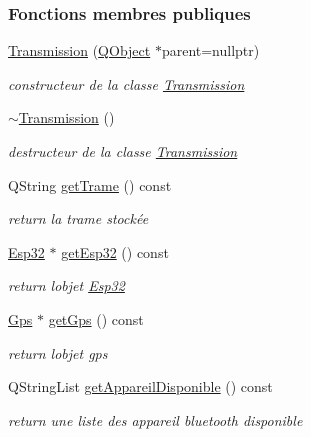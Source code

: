\subsubsection*{Fonctions membres publiques}
\begin{DoxyCompactItemize}
\item 
\hyperlink{class_transmission_a1d8087d2d09b9ddd4fd6e8261daed9f3}{Transmission} (\hyperlink{class_q_object}{Q\+Object} $\ast$parent=nullptr)
\begin{DoxyCompactList}\small\item\em constructeur de la classe \hyperlink{class_transmission}{Transmission} \end{DoxyCompactList}\item 
\hyperlink{class_transmission_adcdc6012d99ddb1d0c3159d50984e146}{$\sim$\+Transmission} ()
\begin{DoxyCompactList}\small\item\em destructeur de la classe \hyperlink{class_transmission}{Transmission} \end{DoxyCompactList}\item 
Q\+String \hyperlink{class_transmission_a3fc179158c8c9e2cceba36423ef92505}{get\+Trame} () const 
\begin{DoxyCompactList}\small\item\em return la trame stockée \end{DoxyCompactList}\item 
\hyperlink{class_esp32}{Esp32} $\ast$ \hyperlink{class_transmission_afccd88f8be8c204a0960bc2d6970931f}{get\+Esp32} () const 
\begin{DoxyCompactList}\small\item\em return l\textquotesingle{}objet \hyperlink{class_esp32}{Esp32} \end{DoxyCompactList}\item 
\hyperlink{class_gps}{Gps} $\ast$ \hyperlink{class_transmission_aa5004c178152de5b94ef14e11e80792c}{get\+Gps} () const 
\begin{DoxyCompactList}\small\item\em return l\textquotesingle{}objet gps \end{DoxyCompactList}\item 
Q\+String\+List \hyperlink{class_transmission_a2a38d0633b4a27dfa3754efcd3db4f9c}{get\+Appareil\+Disponible} () const 
\begin{DoxyCompactList}\small\item\em return une liste des appareil bluetooth disponible \end{DoxyCompactList}\item 

\end{DoxyCompactItemize}

